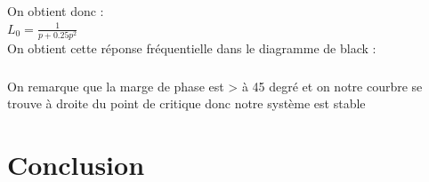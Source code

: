 \documentclass[12pt, a4paper, openany]{report}
\begin{document}
On obtient donc : \\

$ L_{0}= \frac{1}{ p + 0.25 p^2 } $ \\

On obtient cette réponse fréquentielle dans le diagramme de black : \\

\begin{center}
     \label{fig}
 \end{center} 


\paragraph{}


On remarque que la  marge de phase est > à 45 degré et on notre courbre se trouve à droite du point de critique donc notre système est stable\\ 









\chapter*{Conclusion}
 

  
\end{document}
